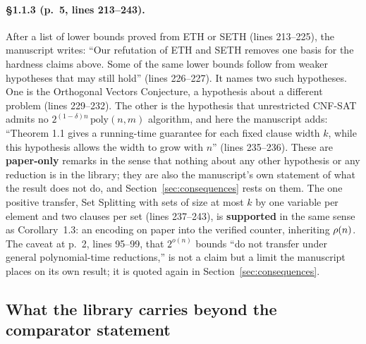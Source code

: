 \paragraph{\S1.1.3 (p.~5, lines 213--243).}
After a list of lower bounds proved from ETH or SETH (lines 213--225),
the manuscript writes: ``Our refutation of ETH and SETH removes one basis
for the hardness claims above. Some of the same lower bounds follow from
weaker hypotheses that may still hold'' (lines 226--227). It names two such hypotheses. One is the Orthogonal Vectors Conjecture, a hypothesis about a different problem (lines 229--232). The other is the hypothesis that
unrestricted CNF-SAT admits no $2^{(1-\delta)n}\,\mathrm{poly}(n,m)$
algorithm, and here the manuscript adds: ``Theorem 1.1 gives a running-time guarantee for each
fixed clause width $k$, while this hypothesis allows the width to grow
with $n$'' (lines 235--236). These are \textbf{paper-only} remarks in
the sense that nothing about any other hypothesis or any reduction is in
the library; they are also the manuscript's own statement of what the
result does not do, and Section~\ref{sec:consequences} rests on them.
The one positive transfer, Set Splitting with sets of size at most $k$
by one variable per element and two clauses per set (lines 237--243), is
\textbf{supported} in the same sense as Corollary~1.3: an encoding on
paper into the verified counter, inheriting $\rho(n)$. The caveat at
p.~2, lines 95--99, that $2^{o(n)}$ bounds ``do not transfer under
general polynomial-time reductions,'' is not a claim but a limit the
manuscript places on its own result; it is quoted again in
Section~\ref{sec:consequences}.

\subsection{What the library carries beyond the comparator statement}
\label{sec:beyond-lean}


